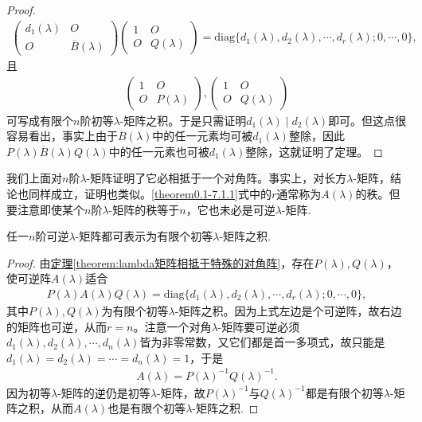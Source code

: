 \documentclass[../../main.tex]{subfiles}
\begin{document}
\begin{proof}
\begin{align*}
\begin{pmatrix}
d_1(\lambda)&O\\
O&\overline{B}(\lambda)
\end{pmatrix}
\begin{pmatrix}
1&O\\
O&Q(\lambda)
\end{pmatrix}
=\mathrm{diag}\{d_1(\lambda),d_2(\lambda),\cdots,d_r(\lambda);0,\cdots,0\},
\end{align*}
且
\begin{align*}
\begin{pmatrix}
1&O\\
O&P(\lambda)
\end{pmatrix},
\begin{pmatrix}
1&O\\
O&Q(\lambda)
\end{pmatrix}
\end{align*}
可写成有限个$n$阶初等$\lambda$-矩阵之积。于是只需证明$d_1(\lambda)\mid d_2(\lambda)$即可。但这点很容易看出，事实上由于$\overline{B}(\lambda)$中的任一元素均可被$d_1(\lambda)$整除，因此$P(\lambda)\overline{B}(\lambda)Q(\lambda)$中的任一元素也可被$d_1(\lambda)$整除，这就证明了定理。
\end{proof}
\begin{remark}
我们上面对$n$阶$\lambda$-矩阵证明了它必相抵于一个对角阵。事实上，对长方$\lambda$-矩阵，结论也同样成立，证明也类似。\eqref{theorem0.1-7.1.1}式中的$r$通常称为$A(\lambda)$的秩。但要注意即使某个$n$阶$\lambda$-矩阵的秩等于$n$，它也未必是可逆$\lambda$-矩阵.
\end{remark}

\begin{corollary}
任一$n$阶可逆$\lambda$-矩阵都可表示为有限个初等$\lambda$-矩阵之积.
\end{corollary}
\begin{proof}
由\hyperref[theorem:lambda矩阵相抵于特殊的对角阵]{定理\ref{theorem:lambda矩阵相抵于特殊的对角阵}}，存在$P(\lambda),Q(\lambda)$，使可逆阵$A(\lambda)$适合
\begin{align*}
P(\lambda)A(\lambda)Q(\lambda)=\mathrm{diag}\{d_1(\lambda),d_2(\lambda),\cdots,d_r(\lambda);0,\cdots,0\},
\end{align*}
其中$P(\lambda),Q(\lambda)$为有限个初等$\lambda$-矩阵之积。因为上式左边是个可逆阵，故右边的矩阵也可逆，从而$r = n$。注意一个对角$\lambda$-矩阵要可逆必须$d_1(\lambda),d_2(\lambda),\cdots,d_n(\lambda)$皆为非零常数，又它们都是首一多项式，故只能是$d_1(\lambda)=d_2(\lambda)=\cdots=d_n(\lambda)=1$，于是
\begin{align*}
A(\lambda)=P(\lambda)^{-1}Q(\lambda)^{-1}.
\end{align*}
因为初等$\lambda$-矩阵的逆仍是初等$\lambda$-矩阵，故$P(\lambda)^{-1}$与$Q(\lambda)^{-1}$都是有限个初等$\lambda$-矩阵之积，从而$A(\lambda)$也是有限个初等$\lambda$-矩阵之积. 
\end{proof}
\end{document}
